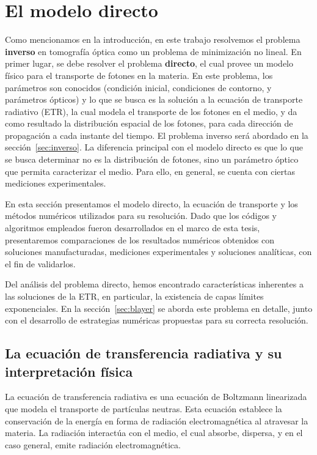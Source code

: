 \pagestyle{fancy}
\chapter{El modelo directo}
\lhead{\thepage}
\pagebreak
Como mencionamos en la introducción, en este trabajo resolvemos el problema {\bf inverso} 
en tomografía óptica como un problema de minimización no lineal. 
En primer lugar, se debe resolver el problema {\bf directo}, 
el cual provee un modelo 
 físico para el transporte de fotones en la materia. En este problema, los parámetros 
son conocidos (condición inicial, condiciones de contorno, 
y parámetros ópticos) y lo que se busca es la solución a la ecuación de transporte radiativo (ETR), la cual modela 
el transporte de los fotones en el medio, y da como resultado la distribución 
espacial de los fotones, para cada dirección de propagación a cada instante del tiempo. 
El problema inverso será abordado en la sección~\ref{sec:inverso}. 
La diferencia principal con el modelo directo es que lo que se busca 
determinar no es la distribución de fotones, sino un parámetro óptico 
que permita caracterizar el medio. Para ello, en general, se cuenta con ciertas mediciones experimentales.

En esta sección presentamos el modelo directo, 
la ecuación de transporte y los métodos numéricos utilizados para su resolución. 
Dado que los códigos y algoritmos empleados 
fueron desarrollados en el marco de esta tesis, presentaremos 
comparaciones de los resultados numéricos obtenidos con soluciones manufacturadas, 
mediciones experimentales y soluciones analíticas, con el fin de validarlos.

Del análisis del problema directo, hemos encontrado características inherentes 
a las soluciones de la ETR, en particular, la existencia de capas límites exponenciales.
En la sección~\ref{sec:blayer} se aborda este problema en detalle, 
junto con el desarrollo de estrategias numéricas propuestas para su correcta 
resolución. 


\section{La ecuación de transferencia radiativa y su interpretación física}
\label{sec:ETR}

La ecuación de transferencia radiativa es una ecuación de Boltzmann 
linearizada que modela el transporte de partículas neutras. Esta ecuación establece 
la conservación de la energía en forma de  
radiación electromagnética al atravesar la materia. La radiación 
interactúa con el medio, el cual absorbe, dispersa, y en el caso 
general, emite radiación electromagnética. 

